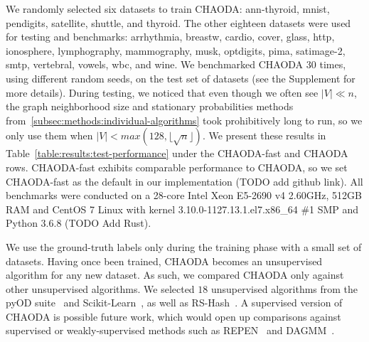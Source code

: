 We randomly selected six datasets to train CHAODA: ann-thyroid, mnist, pendigits, satellite, shuttle, and thyroid.
The other eighteen datasets were used for testing and benchmarks: arrhythmia, breastw, cardio, cover, glass, http, ionosphere, lymphography, mammography, musk, optdigits, pima, satimage-2, smtp, vertebral, vowels, wbc, and wine.
We benchmarked CHAODA 30 times, using different random seeds, on the test set of datasets (see the Supplement for more details).
During testing, we noticed that even though we often see $|V| \ll n $, the graph neighborhood size and stationary probabilities methods from~\ref{subsec:methods:individual-algorithms} took prohibitively long to run, so we only use them when $|V| < max(128, \lfloor \sqrt n \rfloor)$.
We present these results in Table~\ref{table:results:test-performance} under the CHAODA-fast and CHAODA rows.
CHAODA-fast exhibits comparable performance to CHAODA, so we set CHAODA-fast as the default in our implementation (TODO add github link).
All benchmarks were conducted on a 28-core Intel Xeon E5-2690 v4 2.60GHz, 512GB RAM and CentOS 7 Linux with kernel 3.10.0-1127.13.1.el7.x86\_64 \#1 SMP and Python 3.6.8 (TODO Add Rust).

We use the ground-truth labels only during the training phase with a small set of datasets.
Having once been trained, CHAODA becomes an unsupervised algorithm for any new dataset.
As such, we compared CHAODA only against other unsupervised algorithms.
We selected $18$ unsupervised algorithms from the pyOD suite~\cite{zhao2019pyod} and Scikit-Learn~\cite{pedregosa2011scikit}, as well as RS-Hash~\cite{sathe2016subspace}.
A supervised version of CHAODA is possible future work, which would open up comparisons against supervised or weakly-supervised methods such as REPEN~\cite{pang2018learning} and DAGMM~\cite{zong2018deep}.
